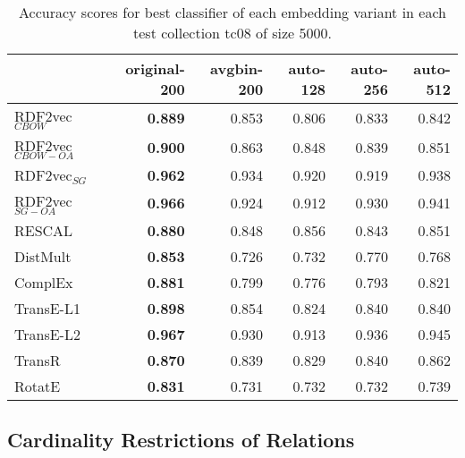 \documentclass[11pt,titlepage,oneside,openany]{book}
\begin{document}
\begin{table}[h!]
\centering
\begin{tabular}{lrrrrr}
\toprule
{} &  original-200 &  avgbin-200 &  auto-128 &  auto-256 &  auto-512 \\
\midrule
RDF2vec$_{CBOW}$     &	\textbf{0.889} &       0.853  &     0.806  &     0.833  &     0.842  \\
RDF2vec$_{CBOW-OA}$  &	\textbf{0.900} &       0.863  &     0.848  &     0.839  &     0.851  \\
RDF2vec$_{SG}$       &	\textbf{0.962} &       0.934  &     0.920  &     0.919  &     0.938  \\
RDF2vec$_{SG-OA}$    &	\textbf{0.966} &       0.924  &     0.912  &     0.930  &     0.941  \\
RESCAL               &	\textbf{0.880} &       0.848  &     0.856  &     0.843  &     0.851  \\
DistMult             &	\textbf{0.853} &       0.726  &     0.732  &     0.770  &     0.768  \\
ComplEx              &	\textbf{0.881} &       0.799  &     0.776  &     0.793  &     0.821  \\
TransE-L1            &	\textbf{0.898} &       0.854  &     0.824  &     0.840  &     0.840  \\
TransE-L2            &	\textbf{0.967} &       0.930  &     0.913  &     0.936  &     0.945  \\
TransR               &	\textbf{0.870} &       0.839  &     0.829  &     0.840  &     0.862  \\
RotatE               &	\textbf{0.831} &       0.731  &     0.732  &     0.732  &     0.739  \\
\bottomrule
\end{tabular}
\caption{Accuracy scores for best classifier of each embedding variant in each test collection tc08 of size 5000.}
\label{tab:dlcc-acc-tc08-5000}
\end{table}

\newpage

\subsection{Cardinality Restrictions of Relations}
\label{subsec:dlcc-results-tc09-tc10}
\end{document}
